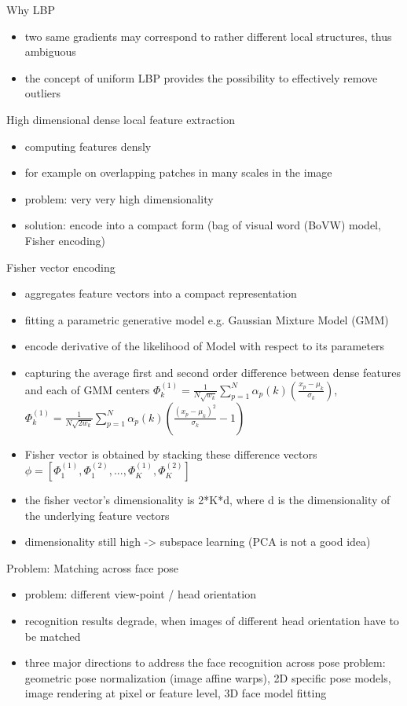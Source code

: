 \documentclass[paper=a4, fontsize=11pt]{scrartcl} %
\numberwithin{equation}{section} %
\numberwithin{figure}{section} %
\numberwithin{table}{section} %
\begin{document}
Why LBP
\begin{itemize}
\item two same gradients may correspond to rather different local structures, thus ambiguous
\item the concept of uniform LBP provides the possibility to effectively remove outliers
\end{itemize}

High dimensional dense local feature extraction
\begin{itemize}
\item computing features densly
\item for example on overlapping patches in many scales in the image
\item problem: very very high dimensionality
\item solution: encode into a compact form (bag of visual word (BoVW) model, Fisher encoding)
\end{itemize}

Fisher vector encoding
\begin{itemize}
\item aggregates feature vectors into a compact representation
\item fitting a parametric generative model e.g. Gaussian Mixture Model (GMM)
\item encode derivative of the likelihood of Model with respect to its parameters
\item capturing the average first and second order difference between dense features and each of GMM centers $\Phi^{(1)}_k = \frac{1}{N \sqrt{w_k}} \sum\limits_{p=1}^{N} \alpha_p(k) (\frac{x_p - \mu_k}{\sigma_k})$, $\Phi^{(1)}_k = \frac{1}{N \sqrt{2 w_k}} \sum\limits_{p=1}^{N} \alpha_p(k) (\frac{(x_p - \mu_k)^2}{\sigma_k} - 1)$
\item Fisher vector is obtained by stacking these difference vectors $\phi = [\Phi_1^{(1)}, \Phi_1^{(2)},...,\Phi_K^{(1)}, \Phi_K^{(2)}]$
\item the fisher vector's dimensionality is 2*K*d, where d is the dimensionality of the underlying feature vectors
\item dimensionality still high -> subspace learning (PCA is not a good idea)
\end{itemize}

Problem: Matching across face pose
\begin{itemize}
\item problem: different view-point / head orientation
\item recognition results degrade, when images of different head orientation have to be matched
\item three major directions to address the face recognition across pose problem: geometric pose normalization (image affine warps), 2D specific pose models, image rendering at pixel or feature level, 3D face model fitting
\end{itemize}
\end{document}
